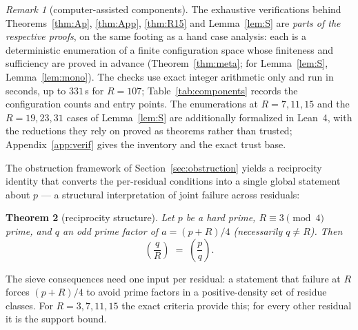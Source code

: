 \documentclass[11pt]{article}
\theoremstyle{plain}
\newtheorem{theorem}{Theorem}[section]
\theoremstyle{remark}
\newtheorem{remark}[theorem]{Remark}
\theoremstyle{plain}
\numberwithin{equation}{section}
\newcommand{\legendre}[2]{\genfrac{(}{)}{}{1}{#1}{#2}}
\begin{document}
\begin{remark}[computer-assisted components]\label{rem:computer}
The exhaustive verifications behind Theorems~\ref{thm:Ap},
\ref{thm:App}, \ref{thm:R15} and Lemma~\ref{lem:S} are \emph{parts of
the respective proofs}, on the same footing as a hand case analysis:
each is a deterministic enumeration of a finite configuration space
whose finiteness and sufficiency are proved in advance
(Theorem~\ref{thm:meta}; for Lemma~\ref{lem:S}, Lemma~\ref{lem:mono}).
The checks use exact integer arithmetic only and run in seconds, up to
$331$\,s for $R = 107$; Table~\ref{tab:components} records the
configuration counts and entry points. The enumerations at
$R = 7, 11, 15$ and the $R = 19, 23, 31$ cases of Lemma~\ref{lem:S}
are additionally formalized in Lean~4, with the reductions they rely
on proved as theorems rather than trusted;
Appendix~\ref{app:verif} gives the inventory and the exact trust base.
\end{remark}

The obstruction framework of Section~\ref{sec:obstruction} yields a
reciprocity identity that converts the per-residual conditions into a
single global statement about $p$ --- a structural interpretation of
joint failure across residuals:

\begin{theorem}[reciprocity structure]\label{thm:J}
Let $p$ be a hard prime, $R \equiv 3 \pmod 4$ prime, and $q$ an odd
prime factor of $a = (p+R)/4$ (necessarily $q \ne R$). Then
\[
  \legendre{q}{R} \;=\; \legendre{p}{q}.
\]
\end{theorem}

The sieve consequences need one input per residual: a statement
that failure at $R$ forces $(p+R)/4$ to avoid prime factors in a
positive-density set of residue classes. For $R = 3, 7, 11, 15$ the
exact criteria provide this; for every other residual it is the
support bound.
\end{document}
